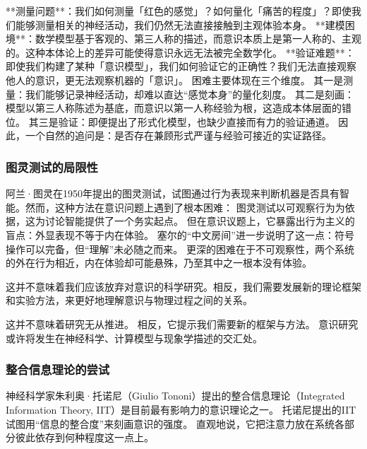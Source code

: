 **测量问题**：我们如何测量「红色的感觉」？如何量化「痛苦的程度」？即使我们能够测量相关的神经活动，我们仍然无法直接接触到主观体验本身。
**建模困境**：数学模型基于客观的、第三人称的描述，而意识本质上是第一人称的、主观的。这种本体论上的差异可能使得意识永远无法被完全数学化。
**验证难题**：即使我们构建了某种「意识模型」，我们如何验证它的正确性？我们无法直接观察他人的意识，更无法观察机器的「意识」。
困难主要体现在三个维度。
其一是测量：我们能够记录神经活动，却难以直达“感觉本身”的量化刻度。
其二是刻画：模型以第三人称陈述为基底，而意识以第一人称经验为根，这造成本体层面的错位。
其三是验证：即便提出了形式化模型，也缺少直接而有力的验证通道。
因此，一个自然的追问是：是否存在兼顾形式严谨与经验可接近的实证路径。



\subsubsection{图灵测试的局限性}

阿兰·图灵在1950年提出的图灵测试，试图通过行为表现来判断机器是否具有智能。然而，这种方法在意识问题上遇到了根本困难：
图灵测试以可观察行为为依据，这为讨论智能提供了一个务实起点。
但在意识议题上，它暴露出行为主义的盲点：外显表现不等于内在体验。
塞尔的“中文房间”进一步说明了这一点：符号操作可以完备，但“理解”未必随之而来。
更深的困难在于不可观察性，两个系统的外在行为相近，内在体验却可能悬殊，乃至其中之一根本没有体验。

\begin{center}
这并不意味着我们应该放弃对意识的科学研究。相反，我们需要发展新的理论框架和实验方法，来更好地理解意识与物理过程之间的关系。
\end{center}
这并不意味着研究无从推进。
相反，它提示我们需要新的框架与方法。
意识研究或许将发生在神经科学、计算模型与现象学描述的交汇处。



\subsubsection{整合信息理论的尝试}

神经科学家朱利奥·托诺尼（Giulio Tononi）提出的整合信息理论（Integrated Information Theory, IIT）是目前最有影响力的意识理论之一。
托诺尼提出的IIT试图用“信息的整合度”来刻画意识的强度。
直观地说，它把注意力放在系统各部分彼此依存到何种程度这一点上。

